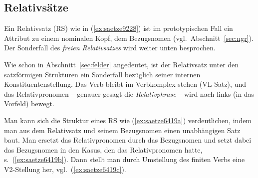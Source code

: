 \begin{exe}
  \ex\label{ex:saetze1450} 
  \begin{xlist}
  \end{xlist}
\end{exe}

\subsection{Relativsätze}

\label{sec:relativsaetze}

Ein Relativsatz (RS) wie in (\ref{ex:saetze9228}) ist im prototypischen Fall ein Attribut zu einem nominalen Kopf, dem Bezugsnomen (vgl.\ Abschnitt~\ref{sec:ngr}).
Der Sonderfall des \textit{freien Relativsatzes} wird weiter unten besprochen.

\begin{exe}
\end{exe}

Wie schon in Abschnitt~\ref{sec:felder} angedeutet, ist der Relativsatz unter den satzförmigen Strukturen ein Sonderfall bezüglich seiner internen Konstituentenstellung.
Das Verb bleibt im Verbkomplex stehen (VL-Satz), und das Relativpronomen -- genauer gesagt die \textit{Relativphrase} -- wird nach links (in das Vorfeld) bewegt.

Man kann sich die Struktur eines RS wie (\ref{ex:saetze6419a}) verdeutlichen, indem man aus dem Relativsatz und seinem Bezugsnomen einen unabhängigen Satz baut.
Man ersetzt das Relativpronomen durch das Bezugsnomen und setzt dabei das Bezugsnomen in den Kasus, den das Relativpronomen hatte, s.\ (\ref{ex:saetze6419b}). 
Dann stellt man durch Umstellung des finiten Verbs eine V2-Stellung her, vgl.\ (\ref{ex:saetze6419c}).

\begin{exe}
  \ex\label{ex:saetze6419}
  \begin{xlist}
  \end{xlist}
\end{exe}

\Enl

